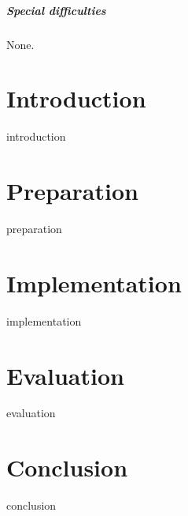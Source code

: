 \documentclass[%
    12pt,
    bibliography=toc,
    listof=leveldown,%
    oneside
]{book}
\begin{document}
\paragraph{Special difficulties}
None.

\tableofcontents

\newpage
\listoffigures
\listoftables
\lstlistoflistings

\mainmatter

\chapter{Introduction}
{introduction}

\chapter{Preparation}
{preparation}

\chapter{Implementation}
{implementation}

\chapter{Evaluation}
{evaluation}

\chapter{Conclusion}
{conclusion}

{}


\appendix
\end{document}
